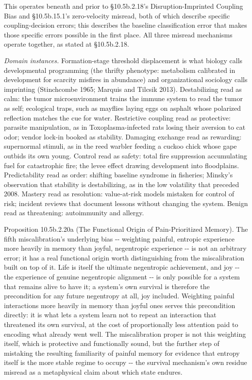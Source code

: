 \documentclass[
]{article}
\begin{document}
This operates beneath and prior to §10.5b.2.18's Disruption-Imprinted
Coupling Bias and §10.5b.15.1's zero-velocity misread, both of which
describe specific coupling-decision errors; this describes the baseline
classification error that makes those specific errors possible in the
first place. All three misread mechanisms operate together, as stated at
§10.5b.2.18.

\emph{Domain instances.} Formation-stage threshold displacement is what
biology calls developmental programming (the thrifty phenotype:
metabolism calibrated in development for scarcity misfires in abundance)
and organizational sociology calls imprinting (Stinchcombe 1965; Marquis
and Tilcsik 2013). Destabilizing read as calm: the tumor
microenvironment trains the immune system to read the tumor as self;
ecological traps, such as mayflies laying eggs on asphalt whose
polarized reflection matches the cue for water. Restrictive coupling
read as protective: parasite manipulation, as in Toxoplasma-infected
rats losing their aversion to cat odor; vendor lock-in booked as
stability. Damaging exchange read as rewarding: supernormal stimuli, as
in the reed warbler feeding a cuckoo chick whose gape outbids its own
young. Control read as safety: total fire suppression accumulating fuel
for catastrophic fire; the levee effect drawing development into
floodplains. Predictability read as order: shifting baseline syndrome in
fisheries; Minsky's observation that stability is destabilizing, as in
the low volatility that preceded 2008. Mastery read as resolution:
value-at-risk models mistaken for control of risk; incident reviews that
document lessons without changing the system. Benign read as
threatening: autoimmunity and allergy.

Proposition 10.5b.2.20a (The Functional Origin of Pain-Prioritized
Memory). The fifth miscalibration's underlying bias -\/- weighting
painful, entropic experience more heavily in memory than joyful,
negentropic experience -\/- is not an arbitrary error; it has a real
functional origin worth distinguishing from the miscalibration built on
top of it. Life is itself the ultimate negentropic achievement, and joy
-\/- the experience of genuine negentropic alignment -\/- is only
possible for a system that remains alive to have it; a system's own
survival is therefore the precondition for any future negentropy at all,
joy included. Weighting painful interactions more heavily in memory than
joyful ones serves this precondition directly: it is what lets a system
learn not to repeat an interaction that threatened its own survival, at
the cost of proportionally less attention paid to encoding what already
went well. The miscalibration proper is not this weighting itself, which
is protective and functionally sound, but the further step of mistaking
the resulting familiarity of painful memory for evidence that entropy
itself is the more stable regime to occupy -\/- the survival mechanism's
own residue misread as a metaphysical claim about which state endures.
\end{document}
